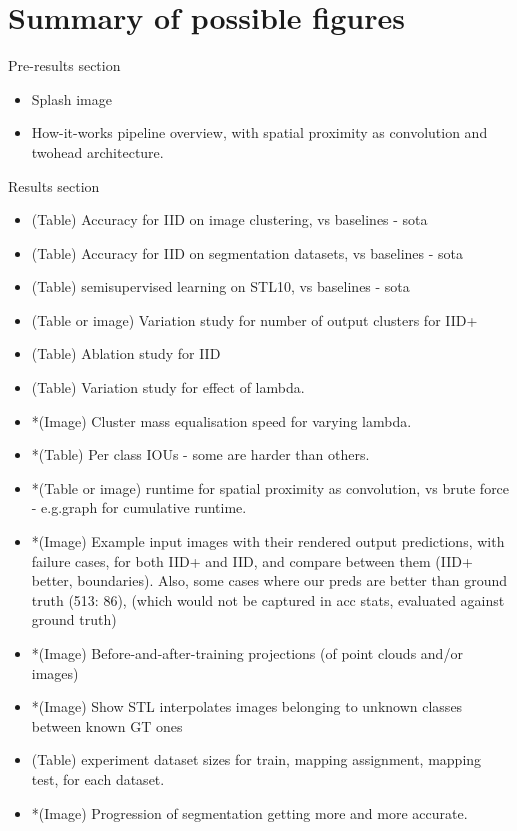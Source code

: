 \section{Summary of possible figures}
Pre-results section
\begin{itemize}
\item Splash image
\item How-it-works pipeline overview, with spatial proximity as convolution and twohead architecture.
\end{itemize}

\noindent Results section 
\begin{itemize}

\item (Table) Accuracy for IID on image clustering, vs baselines - sota
\item (Table) Accuracy for IID on segmentation datasets, vs baselines - sota
\item (Table) semisupervised learning on STL10, vs baselines - sota

\item (Table or image) Variation study for number of output clusters for IID+
\item (Table) Ablation study for IID
\item (Table) Variation study for effect of lambda.
\item *(Image) Cluster mass equalisation speed for varying lambda.
\item *(Table) Per class IOUs - some are harder than others.

\item *(Table or image) runtime for spatial proximity as convolution, vs brute force - e.g.graph for cumulative runtime.

\item *(Image) Example input images with their rendered output predictions, with failure cases, for both IID+ and IID, and compare between them (IID+ better, boundaries). Also, some cases where our preds are better than ground truth (513: 86), (which would not be captured in acc stats, evaluated against ground truth)
\item *(Image) Before-and-after-training projections (of point clouds and/or images)
\item *(Image) Show STL interpolates images belonging to unknown classes between known GT ones
\item (Table) experiment dataset sizes for train, mapping assignment, mapping test, for each dataset.


\item *(Image) Progression of segmentation getting more and more accurate.
\end{itemize}

